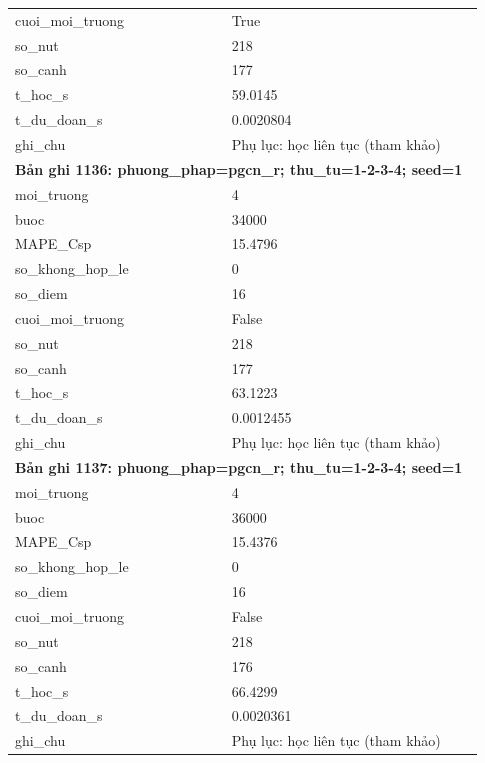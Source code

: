 \begin{longtable}{p{0.43\linewidth}p{0.50\linewidth}}
cuoi\_\allowbreak moi\_\allowbreak truong & True \\
so\_\allowbreak nut & 218 \\
so\_\allowbreak canh & 177 \\
t\_\allowbreak hoc\_\allowbreak s & 59.0145 \\
t\_\allowbreak du\_\allowbreak doan\_\allowbreak s & 0.0020804 \\
ghi\_\allowbreak chu & Phụ lục: học liên tục (tham khảo) \\
\midrule
\multicolumn{2}{p{0.95\linewidth}}{\textbf{Bản ghi 1136: phuong\_phap=pgcn\_r; thu\_tu=1-2-3-4; seed=1}} \\
moi\_\allowbreak truong & 4 \\
buoc & 34000 \\
MAPE\_\allowbreak Csp & 15.4796 \\
so\_\allowbreak khong\_\allowbreak hop\_\allowbreak le & 0 \\
so\_\allowbreak diem & 16 \\
cuoi\_\allowbreak moi\_\allowbreak truong & False \\
so\_\allowbreak nut & 218 \\
so\_\allowbreak canh & 177 \\
t\_\allowbreak hoc\_\allowbreak s & 63.1223 \\
t\_\allowbreak du\_\allowbreak doan\_\allowbreak s & 0.0012455 \\
ghi\_\allowbreak chu & Phụ lục: học liên tục (tham khảo) \\
\midrule
\multicolumn{2}{p{0.95\linewidth}}{\textbf{Bản ghi 1137: phuong\_phap=pgcn\_r; thu\_tu=1-2-3-4; seed=1}} \\
moi\_\allowbreak truong & 4 \\
buoc & 36000 \\
MAPE\_\allowbreak Csp & 15.4376 \\
so\_\allowbreak khong\_\allowbreak hop\_\allowbreak le & 0 \\
so\_\allowbreak diem & 16 \\
cuoi\_\allowbreak moi\_\allowbreak truong & False \\
so\_\allowbreak nut & 218 \\
so\_\allowbreak canh & 176 \\
t\_\allowbreak hoc\_\allowbreak s & 66.4299 \\
t\_\allowbreak du\_\allowbreak doan\_\allowbreak s & 0.0020361 \\
ghi\_\allowbreak chu & Phụ lục: học liên tục (tham khảo) \\

\end{longtable}
